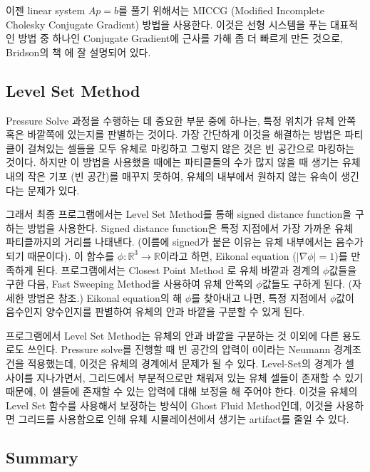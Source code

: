 \documentclass[12pt, A4]{article}
\begin{document}
이젠 linear system $Ap = b$를 풀기 위해서는 MICCG (Modified Incomplete Cholesky Conjugate Gradient) 방법을 사용한다. 이것은 선형 시스템을 푸는 대표적인 방법 중 하나인 Conjugate Gradient에 근사를 가해 좀 더 빠르게 만든 것으로, Bridson의 책 \cite[p.79]{fluid-sim-cg}에 잘 설명되어 있다.

\subsection{Level Set Method}

Pressure Solve 과정을 수행하는 데 중요한 부분 중에 하나는, 특정 위치가 유체 안쪽 혹은 바깥쪽에 있는지를 판별하는 것이다. 가장 간단하게 이것을 해결하는 방법은 파티클이 걸쳐있는 셀들을 모두 유체로 마킹하고 그렇지 않은 것은 빈 공간으로 마킹하는 것이다. 하지만 이 방법을 사용했을 때에는 파티클들의 수가 많지 않을 때 생기는 유체 내의 작은 기포 (빈 공간)를 매꾸지 못하여, 유체의 내부에서 원하지 않는 유속이 생긴다는 문제가 있다.

그래서 최종 프로그램에서는 Level Set Method를 통해 signed distance function을 구하는 방법을 사용한다. Signed distance function은 특정 지점에서 가장 가까운 유체 파티클까지의 거리를 나태낸다. (이름에 signed가 붙은 이유는 유체 내부에서는 음수가 되기 때문이다). 이 함수를 $\phi: \mathbb{R}^3 \rightarrow \mathbb{R}$이라고 하면, Eikonal equation ($|\nabla \phi| = 1$)를 만족하게 된다. 프로그램에서는 Closest Point Method \cite[p. 11]{dist-function}로 유체 바깥과 경계의 $\phi$값들을 구한 다음, Fast Sweeping Method\cite{fast-sweeping}을 사용하여 유체 안쪽의 $\phi$값들도 구하게 된다. (자세한 방법은 \cite[p.49-p.56, p.126]{fluid-sim-cg} 참조.) Eikonal equation의 해 $\phi$를 찾아내고 나면, 특정 지점에서 $\phi$값이 음수인지 양수인지를 판별하여 유체의 안과 바깥을 구분할 수 있게 된다.

프로그램에서 Level Set Method는 유체의 안과 바깥을 구분하는 것 이외에 다른 용도로도 쓰인다. Pressure solve를 진행할 때 빈 공간의 압력이 0이라는 Neumann 경계조건을 적용했는데, 이것은 유체의 경계에서 문제가 될 수 있다. Level-Set의 경계가 셀 사이를 지나가면서, 그리드에서 부분적으로만 채워져 있는 유체 셀들이 존재할 수 있기 때문에, 이 셀들에 존재할 수 있는 압력에 대해 보정을 해 주어야 한다. 이것을 유체의 Level Set 함수를 사용해서 보정하는 방식이 Ghost Fluid Method인데, 이것을 사용하면 그리드를 사용함으로 인해 유체 시뮬레이션에서 생기는 artifact를 줄일 수 있다. \cite[p.127-129]{fluid-sim-cg}

\subsection{Summary}
\end{document}
